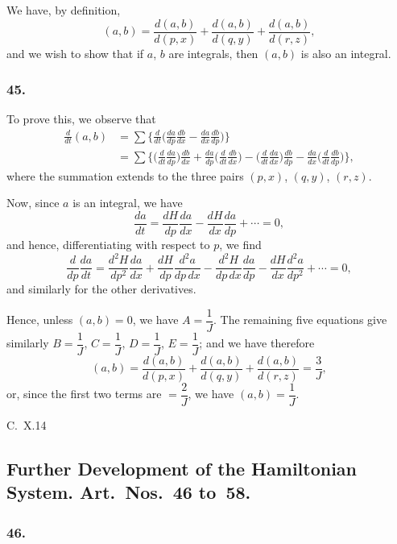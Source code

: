\documentclass[11pt,a4paper]{book}
\begin{document}
We have, by definition,
\[
(a, b) = \frac{d(a, b)}{d(p, x)} + \frac{d(a, b)}{d(q, y)} + \frac{d(a, b)}{d(r, z)},
\]
and we wish to show that if $a$, $b$ are integrals, then $(a, b)$ is also an integral.

\subsubsection*{45.}

To prove this, we observe that
\begin{align*}
\frac{d}{dt}(a, b) &= \sum\biggl\{\frac{d}{dt}\biggl(\frac{da}{dp}\frac{db}{dx} - \frac{da}{dx}\frac{db}{dp}\biggr)\biggr\} \\
&= \sum\biggl\{\biggl(\frac{d}{dt}\frac{da}{dp}\biggr)\frac{db}{dx} + \frac{da}{dp}\biggl(\frac{d}{dt}\frac{db}{dx}\biggr) - \biggl(\frac{d}{dt}\frac{da}{dx}\biggr)\frac{db}{dp} - \frac{da}{dx}\biggl(\frac{d}{dt}\frac{db}{dp}\biggr)\biggr\},
\end{align*}
where the summation extends to the three pairs $(p, x)$, $(q, y)$, $(r, z)$.

Now, since $a$ is an integral, we have
\[
\frac{da}{dt} = \frac{dH}{dp}\frac{da}{dx} - \frac{dH}{dx}\frac{da}{dp} + \cdots = 0,
\]
and hence, differentiating with respect to $p$, we find
\[
\frac{d}{dp}\frac{da}{dt} = \frac{d^{2}H}{dp^{2}}\frac{da}{dx} + \frac{dH}{dp}\frac{d^{2}a}{dp\,dx} - \frac{d^{2}H}{dp\,dx}\frac{da}{dp} - \frac{dH}{dx}\frac{d^{2}a}{dp^{2}} + \cdots = 0,
\]
and similarly for the other derivatives.

\newpage
\setcounter{page}{130}

Hence, unless $(a, b) = 0$, we have $A = \dfrac{1}{J}$. The remaining five equations give similarly $B = \dfrac{1}{J}$, $C = \dfrac{1}{J}$, $D = \dfrac{1}{J}$, $E = \dfrac{1}{J}$; and we have therefore
\[
(a, b) = \frac{d(a, b)}{d(p, x)} + \frac{d(a, b)}{d(q, y)} + \frac{d(a, b)}{d(r, z)} = \frac{3}{J},
\]
or, since the first two terms are $= \dfrac{2}{J}$, we have $(a, b) = \dfrac{1}{J}$.

\medskip\noindent\textsc{C.~X.}\hfill 14

\newpage
\setcounter{page}{131}

\subsection*{Further Development of the Hamiltonian System. Art.~Nos.~46 to~58.}

\subsubsection*{46.}
\end{document}
